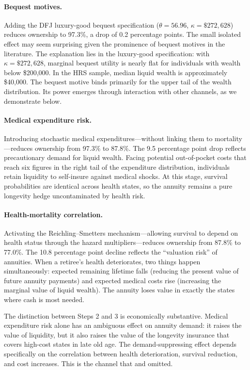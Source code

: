 \documentclass[12pt]{article}
\begin{document}
\paragraph{Bequest motives.} Adding the DFJ luxury-good bequest specification ($\theta = 56.96$, $\kappa = \$272{,}628$) reduces ownership to 97.3\%, a drop of 0.2 percentage points. The small isolated effect may seem surprising given the prominence of bequest motives in the literature. The explanation lies in the luxury-good specification: with $\kappa = \$272{,}628$, marginal bequest utility is nearly flat for individuals with wealth below \$200,000. In the HRS sample, median liquid wealth is approximately \$40,000. The bequest motive binds primarily for the upper tail of the wealth distribution. Its power emerges through interaction with other channels, as we demonstrate below.

\paragraph{Medical expenditure risk.} Introducing stochastic medical expenditures---without linking them to mortality---reduces ownership from 97.3\% to 87.8\%. The 9.5 percentage point drop reflects precautionary demand for liquid wealth. Facing potential out-of-pocket costs that reach six figures in the right tail of the expenditure distribution, individuals retain liquidity to self-insure against medical shocks. At this stage, survival probabilities are identical across health states, so the annuity remains a pure longevity hedge uncontaminated by health risk.

\paragraph{Health-mortality correlation.} Activating the Reichling--Smetters mechanism---allowing survival to depend on health status through the hazard multipliers---reduces ownership from 87.8\% to 77.0\%. The 10.8 percentage point decline reflects the ``valuation risk'' of annuities. When a retiree's health deteriorates, two things happen simultaneously: expected remaining lifetime falls (reducing the present value of future annuity payments) and expected medical costs rise (increasing the marginal value of liquid wealth). The annuity loses value in exactly the states where cash is most needed.

The distinction between Steps 2 and 3 is economically substantive. Medical expenditure risk alone has an ambiguous effect on annuity demand: it raises the value of liquidity, but it also raises the value of the longevity insurance that covers high-cost states in late old age. The demand-suppressing effect depends specifically on the correlation between health deterioration, survival reduction, and cost increases. This is the channel that \citet{pashchenko2013} and \citet{peijnenburg2016} omitted.
\end{document}
